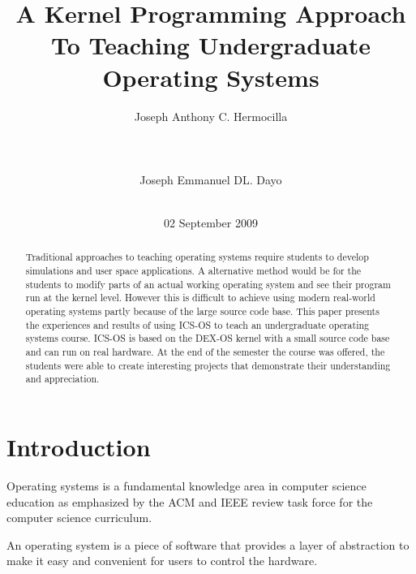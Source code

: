 \documentclass{acm_proc_article-sp}
\begin{document}
\title{A Kernel Programming Approach To Teaching Undergraduate Operating 
Systems}

\author{
\alignauthor
Joseph Anthony C. Hermocilla\\
       \\
       \\
       \\
\alignauthor
Joseph Emmanuel DL. Dayo\\
       \\      
}
\date{02 September 2009}

\maketitle
\begin{abstract}
Traditional approaches to teaching operating systems require students to
develop simulations and user space applications. A alternative method
would be for the students to modify parts of an actual working operating system
and see their program run at the kernel level. However this is difficult to 
achieve using modern real-world operating systems partly because of the large 
source code base. This paper presents the experiences and results of using 
ICS-OS to teach an undergraduate operating systems course. ICS-OS is based on 
the DEX-OS kernel with a small source code base and can run on real hardware. 
At the end of the semester the course was offered, the students were able to
create interesting projects that demonstrate their understanding and 
appreciation.
\end{abstract}


\section{Introduction}
Operating systems is a fundamental knowledge area in computer science education
as emphasized by the ACM and IEEE review task force for the computer science 
curriculum. 

An operating system is a piece of software that provides a layer 
of abstraction to make it easy and convenient for users to control the hardware.
\end{document}
